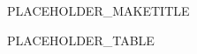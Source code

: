 \documentclass{article}
\begin{document}
{PLACEHOLDER_MAKETITLE}
\date{\today}
\maketitle

{PLACEHOLDER_TABLE}
\end{document}
